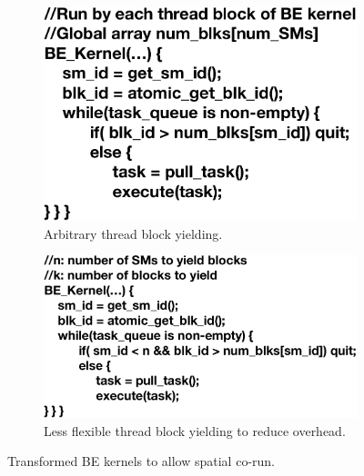 \begin{figure}
\vspace{-.2in}
\begin{center}
\begin{subfigure}[b]{0.3\textwidth}
\includegraphics[width=\linewidth]{figures/trans_1-crop.pdf}
\caption{Arbitrary thread block yielding.}
\label{fig:alg1}
\end{subfigure}
\begin{subfigure}[b]{0.4\textwidth}
\includegraphics[width=\linewidth]{figures/trans_2-crop.pdf}
\caption{Less flexible thread block yielding to reduce overhead.}
\label{fig:alg2}
\end{subfigure}
\end{center}
\caption{Transformed BE kernels to allow spatial co-run.}
\vspace{-.5in}
\end{figure}
